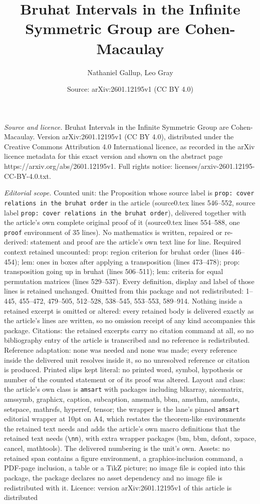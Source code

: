 \documentclass[10pt,a4paper]{amsart}
\title[Bruhat Intervals in the Infinite Symmetric Group are Cohen-M]{Bruhat Intervals in the Infinite Symmetric Group are Cohen-Macaulay}
\author{Nathaniel Gallup, Leo Gray}
\date{Source: arXiv:2601.12195v1 (CC BY 4.0)}
\begin{document}
\maketitle

\noindent\emph{Source and licence.} Bruhat Intervals in the Infinite Symmetric Group are Cohen-Macaulay. Version arXiv:2601.12195v1 (CC BY 4.0), distributed under the Creative Commons Attribution 4.0 International licence, as recorded in the arXiv licence metadata for this exact version and shown on the abstract page https://arxiv.org/abs/2601.12195v1. Full rights notice: licenses/arxiv-2601.12195-CC-BY-4.0.txt.\par\smallskip

\noindent\textit{Editorial scope.} Counted unit: the Proposition whose source label is \texttt{prop: cover relations in the bruhat order} in the article (source0.tex lines 546--552, source label \texttt{prop: cover relations in the bruhat order}), delivered together with the article's own complete original proof of it (source0.tex lines 554--588, one \texttt{proof} environment of 35 lines). No mathematics is written, repaired or re-derived: statement and proof are the article's own text line for line. Required context retained uncounted: prop: region criterion for bruhat order (lines 446--454); lem: ones in boxes after applying a transposition (lines 473--478); prop: transposition going up in bruhat (lines 506--511); lem: criteria for equal permutation matrices (lines 529--537). Every definition, display and label of those lines is retained unchanged. Omitted from this package and not redistributed: 1--445, 455--472, 479--505, 512--528, 538--545, 553--553, 589--914. Nothing inside a retained excerpt is omitted or altered: every retained body is delivered exactly as the article's lines are written, so no omission receipt of any kind accompanies this package. Citations: the retained excerpts carry no citation command at all, so no bibliography entry of the article is transcribed and no reference is redistributed. Reference adaptation: none was needed and none was made; every reference inside the delivered unit resolves inside it, so no unresolved reference or citation is produced. Printed slips kept literal: no printed word, symbol, hypothesis or number of the counted statement or of its proof was altered. Layout and class: the article's own class is \texttt{amsart} with packages including blkarray, nicematrix, amssymb, graphicx, caption, subcaption, amsmath, bbm, amsthm, amsfonts, setspace, mathrsfs, hyperref, tensor; the wrapper is the lane's pinned \texttt{amsart} editorial wrapper at 10pt on A4, which restates the theorem-like environments the retained text needs and adds the article's own macro definitions that the retained text needs (\texttt{\textbackslash nn}), with extra wrapper packages (bm, bbm, dsfont, xspace, cancel, mathtools). The delivered numbering is the unit's own. Assets: no retained span contains a figure environment, a graphics-inclusion command, a PDF-page inclusion, a table or a TikZ picture; no image file is copied into this package, the package declares no asset dependency and no image file is redistributed with it. Licence: version arXiv:2601.12195v1 of this article is distributed 
\end{document}
